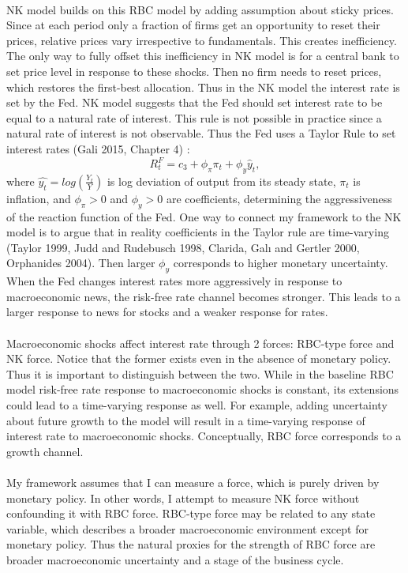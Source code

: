 \documentclass[12pt]{article}
\begin{document}
\paragraph{}
NK model builds on this RBC model by adding assumption about sticky prices. Since at each period only a fraction of firms get an opportunity to reset their prices, relative prices vary irrespective to fundamentals. This creates inefficiency. The only way to fully offset this inefficiency in NK model is for a central bank to set price level in response to these shocks. Then no firm needs to reset prices, which restores the first-best allocation. Thus in the NK model the interest rate is set by the Fed. NK model suggests that the Fed should set interest rate to be equal to a natural rate of interest. This rule is not possible in practice since a natural rate of interest is not observable. Thus the Fed uses a Taylor Rule to set interest rates (Gali 2015, Chapter 4) :
\begin{equation}
    R^F_t = c_3 + \phi_{\pi} \pi_t + \phi_y \hat{y}_t,
\end{equation}
where $\hat{y_t} = log(\frac{Y_t}{Y})$ is log deviation of output from its steady state, $\pi_t$ is inflation, and $\phi_{\pi} > 0$ and $\phi_{y} > 0$ are coefficients, determining the aggressiveness of the reaction function of the Fed. One way to connect my framework to the NK model is to argue that in reality coefficients in the Taylor rule are time-varying (Taylor 1999, Judd and Rudebusch 1998, Clarida, Galı and Gertler 2000, Orphanides
2004). Then larger $\phi_y$ corresponds to higher monetary uncertainty. When the Fed changes interest rates more aggressively in response to macroeconomic news, the risk-free rate channel becomes stronger. This leads to a larger response to news for stocks and a weaker response for rates.
\paragraph{}
Macroeconomic shocks affect interest rate through 2 forces: RBC-type force and NK force. Notice that the former exists even in the absence of monetary policy. Thus it is important to distinguish between the two. While in the baseline RBC model risk-free rate response to macroeconomic shocks is constant, its extensions could lead to a time-varying response as well. For example, adding uncertainty about future growth to the model will result in a time-varying response of interest rate to macroeconomic shocks. Conceptually, RBC force corresponds to a growth channel.
\paragraph{}
My framework assumes that I can measure a force, which is purely driven by monetary policy. In other words, I attempt to measure NK force without confounding it with RBC force. RBC-type force may be related to any state variable, which describes a broader macroeconomic environment except for monetary policy. Thus the natural proxies for the strength of RBC force are broader macroeconomic uncertainty and a stage of the business cycle.
\end{document}

